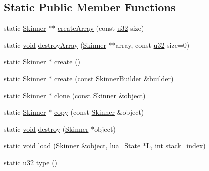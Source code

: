\subsection*{Static Public Member Functions}
\begin{DoxyCompactItemize}
\item 
static \mbox{\hyperlink{classnjli_1_1_skinner}{Skinner}} $\ast$$\ast$ \mbox{\hyperlink{classnjli_1_1_skinner_a0734a98004e5c67690903c48a1d63115}{create\+Array}} (const \mbox{\hyperlink{_util_8h_a10e94b422ef0c20dcdec20d31a1f5049}{u32}} size)
\item 
static \mbox{\hyperlink{_thread_8h_af1e856da2e658414cb2456cb6f7ebc66}{void}} \mbox{\hyperlink{classnjli_1_1_skinner_aaaec43167e79100f72744b21f5c4e370}{destroy\+Array}} (\mbox{\hyperlink{classnjli_1_1_skinner}{Skinner}} $\ast$$\ast$array, const \mbox{\hyperlink{_util_8h_a10e94b422ef0c20dcdec20d31a1f5049}{u32}} size=0)
\item 
static \mbox{\hyperlink{classnjli_1_1_skinner}{Skinner}} $\ast$ \mbox{\hyperlink{classnjli_1_1_skinner_a78feceb3e2e4785dddf2c34effa2a0f3}{create}} ()
\item 
static \mbox{\hyperlink{classnjli_1_1_skinner}{Skinner}} $\ast$ \mbox{\hyperlink{classnjli_1_1_skinner_abde17c25b0dd465be2cf5a9eec8fbea6}{create}} (const \mbox{\hyperlink{classnjli_1_1_skinner_builder}{Skinner\+Builder}} \&builder)
\item 
static \mbox{\hyperlink{classnjli_1_1_skinner}{Skinner}} $\ast$ \mbox{\hyperlink{classnjli_1_1_skinner_a099db5a3a6cacd9ae2485fb4e9b05998}{clone}} (const \mbox{\hyperlink{classnjli_1_1_skinner}{Skinner}} \&object)
\item 
static \mbox{\hyperlink{classnjli_1_1_skinner}{Skinner}} $\ast$ \mbox{\hyperlink{classnjli_1_1_skinner_ab8442114221e6016091c544584da30fe}{copy}} (const \mbox{\hyperlink{classnjli_1_1_skinner}{Skinner}} \&object)
\item 
static \mbox{\hyperlink{_thread_8h_af1e856da2e658414cb2456cb6f7ebc66}{void}} \mbox{\hyperlink{classnjli_1_1_skinner_a977a61c154a63f6d1517a99dbb11ab68}{destroy}} (\mbox{\hyperlink{classnjli_1_1_skinner}{Skinner}} $\ast$object)
\item 
static \mbox{\hyperlink{_thread_8h_af1e856da2e658414cb2456cb6f7ebc66}{void}} \mbox{\hyperlink{classnjli_1_1_skinner_a7d6b3e1a1e1fb58323d50ed7b8fce536}{load}} (\mbox{\hyperlink{classnjli_1_1_skinner}{Skinner}} \&object, lua\+\_\+\+State $\ast$L, int stack\+\_\+index)
\item 
static \mbox{\hyperlink{_util_8h_a10e94b422ef0c20dcdec20d31a1f5049}{u32}} \mbox{\hyperlink{classnjli_1_1_skinner_aa6ddbc193192b2e5ddcca57cd936e7a9}{type}} ()
\end{DoxyCompactItemize}
